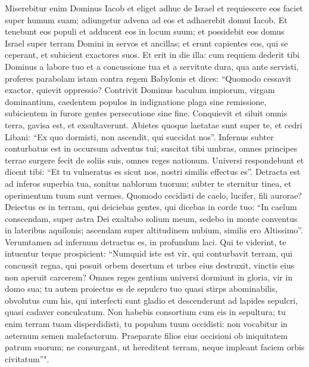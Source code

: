 \begin{biblechapter}  
\verse Miserebitur enim Dominus Iacob et eliget adhuc de Israel et requiescere eos faciet super humum suam; adiungetur advena ad eos et adhaerebit domui Iacob. 
\verse Et tenebunt eos populi et adducent eos in locum suum; et possidebit eos domus Israel super terram Domini in servos et ancillas; et erunt capientes eos, qui se ceperant, et subicient exactores suos. 
\verse Et erit in die illa: cum requiem dederit tibi Dominus a labore tuo et a concussione tua et a servitute dura, qua ante servisti, 
\verse proferes parabolam istam contra regem Babylonis et dices: “Quomodo cessavit exactor, quievit oppressio? 
\verse Contrivit Dominus baculum impiorum, virgam dominantium, 
\verse caedentem populos in indignatione plaga sine remissione, subicientem in furore gentes persecutione sine fine. 
\verse Conquievit et siluit omnis terra, gavisa est, et exsultaverunt. 
\verse Abietes quoque laetatae sunt super te, et cedri Libani: “Ex quo dormisti, non ascendit, qui succidat nos”. 
\verse Infernus subter conturbatus est in occursum adventus tui; suscitat tibi umbras, omnes principes terrae surgere fecit de soliis suis, omnes reges nationum. 
\verse Universi respondebunt et dicent tibi: “Et tu vulneratus es sicut nos, nostri similis effectus es”. 
\verse Detracta est ad inferos superbia tua, sonitus nablorum tuorum; subter te sternitur tinea, et operimentum tuum sunt vermes. 
\verse Quomodo cecidisti de caelo, lucifer, fili aurorae? Deiectus es in terram, qui deiciebas gentes, 
\verse qui dicebas in corde tuo: “In caelum conscendam, super astra Dei exaltabo solium meum, sedebo in monte conventus in lateribus aquilonis; 
\verse ascendam super altitudinem nubium, similis ero Altissimo”. 
\verse Verumtamen ad infernum detractus es, in profundum laci. 
\verse Qui te viderint, te intuentur teque prospicient: “Numquid iste est vir, qui conturbavit terram, qui concussit regna, 
\verse qui posuit orbem desertum et urbes eius destruxit, vinctis eius non aperuit carcerem? 
\verse Omnes reges gentium universi dormiunt in gloria, vir in domo sua; 
\verse tu autem proiectus es de sepulcro tuo quasi stirps abominabilis, obvolutus cum his, qui interfecti sunt gladio et descenderunt ad lapides sepulcri, quasi cadaver conculcatum. 
\verse Non habebis consortium cum eis in sepultura; tu enim terram tuam disperdidisti, tu populum tuum occidisti: non vocabitur in aeternum semen malefactorum. 
\verse Praeparate filios eius occisioni ob iniquitatem patrum suorum; ne consurgant, ut hereditent terram, neque impleant faciem orbis civitatum”". 

\end{biblechapter}
